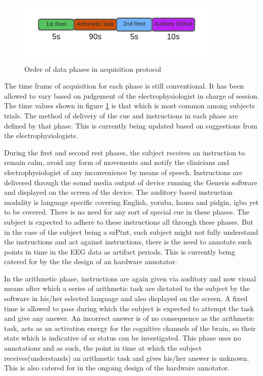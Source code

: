 \documentclass[10pt]{article}
\begin{document}
\begin{figure}[H]
  \includegraphics{images/data_phases.png}
  \caption{Order of data phases in acquisition protocol}
  \label{fig:data phases}
\end{figure}

The time frame of acquisition for each phase is still conventional. It has been 
allowed to vary based on judgement of the electrophysiologist in charge of session.
The time values shown in figure \ref{fig:data phases} is that which is most 
common among subjects trials. The method of delivery of the cue 
and instructions in each phase are defined by that phase. This is currently being 
updated based on suggestions from the electrophysiologists.

During the first and second rest phases, the subject receives an instruction to remain calm, 
avoid any form of movements and notify the clinicians and electrophysiologist of any 
inconvenience by means of speech. Instructions are delivered through the sound media output of device running the 
Generis software and displayed  on the screen of the device. The auditory based instruction modality is language specific covering 
English, yoruba, hausa and pidgin, igbo yet to be covered. There is no need for any sort of special cue in these phases. 
The subject is expected to adhere to these instructions all through  these phases. But in the 
case of the subject being a \gls{szPtnt}, such subject might not fully understand the 
instructions and act against instructions, there is the need to annotate such points in time 
in the EEG data as artifact periods. This is currently being catered for by the the design of an hardware annotator.

In the arithmetic phase, instructions are again given via auditory and now visual means 
after which a series of arithmetic task are dictated to the subject by the software in his/her selected language 
and also displayed on the screen. A fixed time is allowed to pass during which the subject is expected 
to attempt the task and give  any answer. An incorrect answer is of no consequence as the arithmetic task, 
acts as an activation energy for the cognitive channels of the brain, so their state which is indicative of 
\gls{sz} status can be investigated. This phase uses no annotations and as such, the point in time 
at which the subject receives(understands) an arithmetic task and gives his/her answer is unknown. This is also catered for in 
the ongoing design of the hardware annotator.
\end{document}
